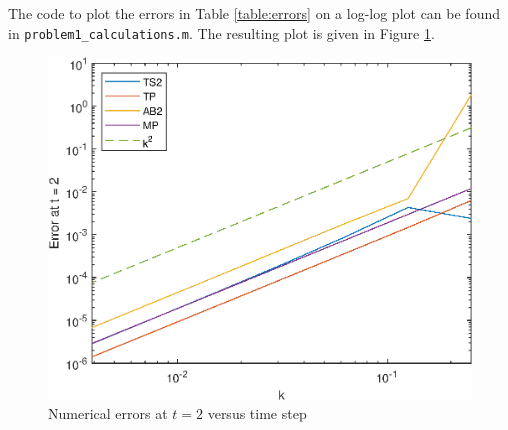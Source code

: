 \documentclass{homework}
\begin{document}
\begin{alphaparts}
		\questionpart The code to plot the errors in Table \ref{table:errors} on a log-log plot can be found in \verb*|problem1_calculations.m|. The resulting plot is given in Figure \ref{fig:error_plot}.
		\begin{figure}
			\centering
			\includegraphics{p1f_plot.eps}
			\caption{Numerical errors at $t = 2$ versus time step}
			\label{fig:error_plot}
		\end{figure}
	\end{alphaparts}
	
	\question
	
\end{document}
